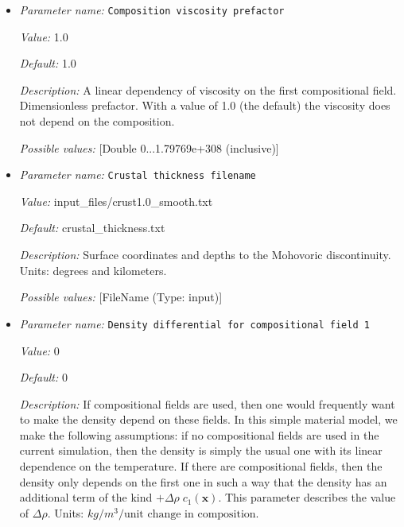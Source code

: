\begin{itemize}
\item {\it Parameter name:} {\tt Composition viscosity prefactor}
\label{parameters:Material model/Stamps model/Composition viscosity prefactor}


{\it Value:} 1.0


{\it Default:} 1.0


{\it Description:} A linear dependency of viscosity on the first compositional field. Dimensionless prefactor. With a value of 1.0 (the default) the viscosity does not depend on the composition.


{\it Possible values:} [Double 0...1.79769e+308 (inclusive)]
\item {\it Parameter name:} {\tt Crustal thickness filename}
\label{parameters:Material model/Stamps model/Crustal thickness filename}


{\it Value:} input_files/crust1.0_smooth.txt


{\it Default:} crustal_thickness.txt


{\it Description:} Surface coordinates and depths to the Mohovoric discontinuity. Units: degrees and kilometers.


{\it Possible values:} [FileName (Type: input)]
\item {\it Parameter name:} {\tt Density differential for compositional field 1}
\label{parameters:Material model/Stamps model/Density differential for compositional field 1}


{\it Value:} 0


{\it Default:} 0


{\it Description:} If compositional fields are used, then one would frequently want to make the density depend on these fields. In this simple material model, we make the following assumptions: if no compositional fields are used in the current simulation, then the density is simply the usual one with its linear dependence on the temperature. If there are compositional fields, then the density only depends on the first one in such a way that the density has an additional term of the kind $+\Delta \rho \; c_1(\mathbf x)$. This parameter describes the value of $\Delta \rho$. Units: $kg/m^3/\textrm{unit change in composition}$.



\end{itemize}
